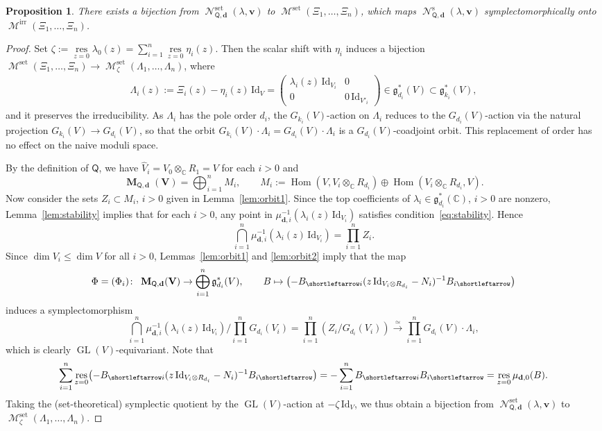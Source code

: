 \documentclass[pdftex]{sigma}
\newcommand{\slar}{\shortleftarrow}
\numberwithin{equation}{section}
\newtheorem{Proposition}[Theorem]{Proposition}
\theoremstyle{definition}
\newcommand{\lemref}[1]{Lemma~\ref{#1}}
\newcommand{\C}{\mathbb{C}} %
\newcommand{\GL}{\operatorname{GL}} %
\newcommand{\g}{\mathfrak{g}} %
\newcommand{\Hom}{\operatorname{Hom}}
\newcommand{\unit}{\mathrm{Id}}
\newcommand{\bM}{\operatorname{\mathbf{M}}}
\newcommand{\bV}{\mathbf{V}}
\newcommand{\bv}{\mathbf{v}}
\newcommand{\res}{\operatorname*{res}}
\newcommand{\ved}{\mathbf{d}}
\newcommand{\Mirr}{\operatorname{\mathcal{M}}^\mathrm{irr}}
\newcommand{\Mset}{\operatorname{\mathcal{M}}^\mathrm{set}}
\newcommand{\Qst}{\operatorname{\mathscr{N}}^\mathrm{s}}
\newcommand{\Qset}{\operatorname{\mathscr{N}}^\mathrm{set}}
\newcommand{\QQ}{\mathsf{Q}} %
\begin{document}
\begin{Proposition}\label{prop:moduli}
There exists a bijection from $\Qset_{\QQ,\ved}(\lambda,\bv)$ to
$\Mset(\Xi_1,\dots ,\Xi_n)$, which maps
$\Qst_{\QQ,\ved}(\lambda,\bv)$ symplectomorphically onto
$\Mirr(\Xi_1,\dots ,\Xi_n)$.
\end{Proposition}

\begin{proof}
Set $\zeta := \res\limits_{z=0} \lambda_0(z)=\sum\limits_{i=1}^n \res\limits_{z=0}\eta_i(z)$.
Then the scalar shift with $\eta_i$ induces a bijection
$\Mset(\Xi_1,\dots ,\Xi_n) \to
\Mset_\zeta(\Lambda_1,\dots ,\Lambda_n)$, where
\begin{gather}\label{eq:type}
\Lambda_i(z) := \Xi_i(z) - \eta_i(z)\,\unit_V =
\begin{pmatrix}
\lambda_i(z)\,\unit_{V_i} & 0 \\
0 & 0\,\unit_{V'_i} \end{pmatrix} \in \g^*_{d_i}(V) \subset \g^*_{k_i}(V),
\end{gather}
and it preserves the irreducibility.
As $\Lambda_i$ has the pole order $d_i$,
the $G_{k_i}(V)$-action on $\Lambda_i$ reduces to the $G_{d_i}(V)$-action
via the natural projection $G_{k_i}(V) \to G_{d_i}(V)$,
so that the orbit $G_{k_i}(V) \cdot \Lambda_i = G_{d_i}(V) \cdot \Lambda_i$
is a $G_{d_i}(V)$-coadjoint orbit.
This replacement of order has no ef\/fect on the naive moduli space.

By the def\/inition of $\QQ$,
we have $\widehat{V}_i=V_0 \otimes_\C R_1 = V$ for each $i >0$
and
\[
\bM_{\QQ,\ved}(\bV) = \bigoplus_{i=1}^n M_i, \qquad
M_i := \Hom(V,V_i \otimes_\C R_{d_i})
\oplus \Hom(V_i \otimes_\C R_{d_i}, V).
\]
Now consider the sets $Z_i \subset M_i$, $i>0$ given in \lemref{lem:orbit1}.
Since the top coef\/f\/icients of $\lambda_i \in \g^*_{d_i}(\C)$,
$i>0$ are nonzero,
\lemref{lem:stability} implies that for each $i>0$,
any point in $\mu_{\ved,i}^{-1}(\lambda_i(z)\,\unit_{V_i})$
satisf\/ies condition~\eqref{eq:stability}.
Hence
\[
\bigcap_{i=1}^n \mu_{\ved,i}^{-1}(\lambda_i(z)\,\unit_{V_i})
= \prod_{i=1}^n Z_i.
\]
Since $\dim V_i \leq \dim V$ for all $i>0$,
Lemmas~\ref{lem:orbit1} and \ref{lem:orbit2} imply that the map
\begin{gather}\label{eq:Phi}
\Phi=(\Phi_i) \colon \ \bM_{\QQ,\ved}(\bV)
\to \bigoplus_{i=1}^n \g^*_{d_i}(V), \qquad
B \mapsto  \bigl(
-B_{\slar i} (z\,\unit_{V_i \otimes R_{d_i}} - N_i)^{-1} B_{i \slar}
\bigr)
\end{gather}
induces a symplectomorphism
\[
\bigcap_{i=1}^n \mu_{\ved,i}^{-1}(\lambda_i(z)\,\unit_{V_i})
/ \prod_{i=1}^n G_{d_i}(V_i)
= \prod_{i=1}^n \left( Z_i/G_{d_i}(V_i) \right)
\xrightarrow{\simeq} \prod_{i=1}^n G_{d_i}(V) \cdot \Lambda_i,
\]
which is clearly $\GL(V)$-equivariant.
Note that
\[
\sum_{i=1}^n \res_{z=0}
\bigl(
-B_{\slar i} (z\,\unit_{V_i \otimes R_{d_i}} - N_i)^{-1} B_{i \slar}
\bigr)
= -\sum_{i=1}^n B_{\slar i} B_{i \slar}
= \res_{z=0} \mu_{\ved,0}(B).
\]
Taking the (set-theoretical) symplectic quotient
by the $\GL(V)$-action at $-\zeta\,\unit_V$,
we thus obtain a bijection from $\Qset_{\QQ,\ved}(\lambda,\bv)$ to
$\Mset_\zeta(\Lambda_1,\dots ,\Lambda_n)$.


\end{proof}
\end{document}
